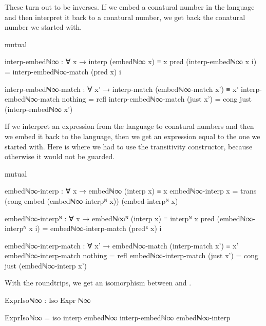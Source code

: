 These turn out to be inverses. If we embed a conatural number in the language
and then interpret it back to a conatural number, we get back the conatural
number we started with.
\begin{code}[hide]
mutual
\end{code}
\begin{code}
  interp-embedℕ∞ : ∀ x → interp (embedℕ∞ x) ≡ x
  pred (interp-embedℕ∞ x i) =
    interp-embedℕ∞-match (pred x) i

  interp-embedℕ∞-match :
    ∀ x' → interp-match (embedℕ∞-match x') ≡ x'
  interp-embedℕ∞-match nothing    = refl
  interp-embedℕ∞-match (just x')  =
    cong just (interp-embedℕ∞ x')
\end{code}
If we interpret an expression from the language to conatural numbers and then we
embed it back to the language, then we get an expression equal to the one we
started with. Here is where we had to use the transitivity constructor, because
otherwise it would not be guarded.
\begin{code}[hide]
mutual
\end{code}
\begin{code}
  embedℕ∞-interp : ∀ x → embedℕ∞ (interp x) ≡ x
  embedℕ∞-interp x =
    trans
      (cong embed (embedℕ∞-interpᴺ x))
      (embed-interpᴺ x)

  embedℕ∞-interpᴺ :
    ∀ x → embedℕ∞ᴺ (interp x) ≡ interpᴺ x
  pred (embedℕ∞-interpᴺ x i) =
    embedℕ∞-interp-match (predᴱ x) i

  embedℕ∞-interp-match :
    ∀ x' → embedℕ∞-match (interp-match x') ≡ x'
  embedℕ∞-interp-match nothing    = refl
  embedℕ∞-interp-match (just x')  =
    cong just (embedℕ∞-interp x')
\end{code}
With the roundtrips, we get an isomorphism between  and
.
\begin{code}
ExprIsoℕ∞ : Iso Expr ℕ∞
\end{code}
\begin{code}[hide]
ExprIsoℕ∞ = iso interp embedℕ∞ interp-embedℕ∞ embedℕ∞-interp
\end{code}

